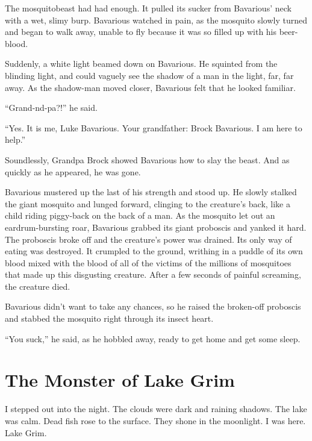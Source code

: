 The mosquitobeast had had enough. It pulled its sucker from
Bavarious' neck with a wet, slimy burp. Bavarious watched in
pain, as the mosquito slowly turned and began to walk away, unable
to fly because it was so filled up with his beer-blood.



Suddenly, a white light beamed down on Bavarious. He squinted from
the blinding light, and could vaguely see the shadow of a man in
the light, far, far away. As the shadow-man moved closer, Bavarious
felt that he looked familiar.



``Grand-nd-pa?!'' he said.



``Yes. It is me, Luke Bavarious. Your grandfather: Brock
Bavarious. I am here to help.''



Soundlessly, Grandpa Brock showed Bavarious how to slay the beast.
And as quickly as he appeared, he was gone.



Bavarious mustered up the last of his strength and stood up. He
slowly stalked the giant mosquito and lunged forward, clinging to
the creature's back, like a child riding piggy-back on the
back of a man. As the mosquito let out an eardrum-bursting roar,
Bavarious grabbed its giant proboscis and yanked it hard. The
proboscis broke off and the creature's power was drained. Its
only way of eating was destroyed. It crumpled to the ground,
writhing in a puddle of its own blood mixed with the blood of all
of the victims of the millions of mosquitoes that made up this
disgusting creature. After a few seconds of painful screaming, the
creature died.



Bavarious didn't want to take any chances, so he raised the
broken-off proboscis and stabbed the mosquito right through its
insect heart.



``You suck,'' he said, as he hobbled away, ready to get
home and get some sleep.


\chapter{The Monster of Lake Grim}



I stepped out into the night. The clouds were dark and raining
shadows. The lake was calm. Dead fish rose to the surface. They
shone in the moonlight. I was here. Lake Grim.




